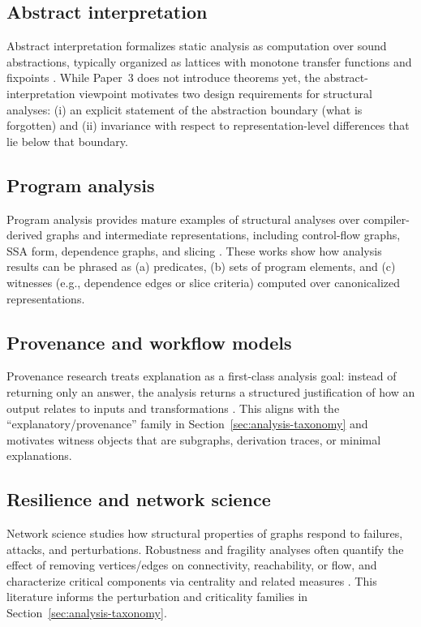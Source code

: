 \documentclass[11pt]{article}
\begin{document}
\subsection{Abstract interpretation}
Abstract interpretation formalizes static analysis as computation over sound abstractions, typically organized as lattices with monotone transfer functions and fixpoints \cite{cousot1977}. While Paper~3 does not introduce theorems yet, the abstract-interpretation viewpoint motivates two design requirements for structural analyses: (i) an explicit statement of the abstraction boundary (what is forgotten) and (ii) invariance with respect to representation-level differences that lie below that boundary.

\subsection{Program analysis}
Program analysis provides mature examples of structural analyses over compiler-derived graphs and intermediate representations, including control-flow graphs, SSA form, dependence graphs, and slicing \cite{lengauer1979,cytron1991,ferrante1987,weiser1981}. These works show how analysis results can be phrased as (a) predicates, (b) sets of program elements, and (c) witnesses (e.g., dependence edges or slice criteria) computed over canonicalized representations.

\subsection{Provenance and workflow models}
Provenance research treats explanation as a first-class analysis goal: instead of returning only an answer, the analysis returns a structured justification of how an output relates to inputs and transformations \cite{buneman2001,cheney2009,w3cprov,deelman2009}. This aligns with the ``explanatory/provenance'' family in Section~\ref{sec:analysis-taxonomy} and motivates witness objects that are subgraphs, derivation traces, or minimal explanations.

\subsection{Resilience and network science}
Network science studies how structural properties of graphs respond to failures, attacks, and perturbations. Robustness and fragility analyses often quantify the effect of removing vertices/edges on connectivity, reachability, or flow, and characterize critical components via centrality and related measures \cite{albert2000,newman2010}. This literature informs the perturbation and criticality families in Section~\ref{sec:analysis-taxonomy}.
\end{document}
